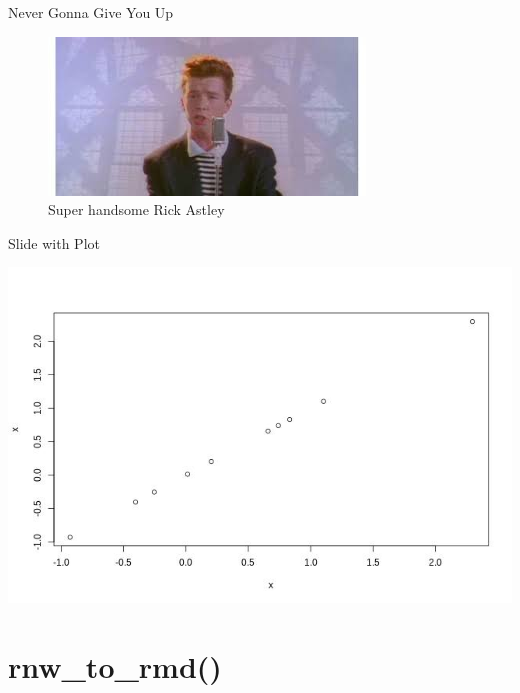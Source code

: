 \documentclass[ignorenonframetext,]{beamer}
\begin{document}
\begin{frame}{Never Gonna Give You Up}

\begin{figure}
\centering
\includegraphics{foto.jpg}
\caption{Super handsome Rick Astley}
\end{figure}

\end{frame}

\begin{frame}{Slide with Plot}

\scriptsize\includegraphics{pres_files/figure-beamer/unnamed-chunk-5-1.jpeg}

\end{frame}

\section{rnw\_to\_rmd()}\label{rnw_to_rmd}
\end{document}
